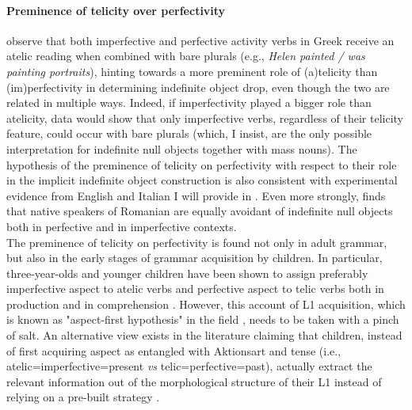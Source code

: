 \paragraph{Preminence of telicity over perfectivity}
\textcite[1598]{TsimpliPapadopoulou2006} observe that both imperfective and perfective activity verbs in Greek receive an atelic reading when combined with bare plurals (e.g., \textit{Helen painted / was painting portraits}), hinting towards a more preminent role of (a)telicity than (im)perfectivity in determining indefinite object drop, even though the two are related in multiple ways. Indeed, if imperfectivity played a bigger role than atelicity, data would show that only imperfective verbs, regardless of their telicity feature, could occur with bare plurals (which, I insist, are the only possible interpretation for indefinite null objects together with mass nouns). The hypothesis of the preminence of telicity on perfectivity with respect to their role in the implicit indefinite object construction is also consistent with experimental evidence from English and Italian I will provide in . Even more strongly, \textcite{Stoica2017} finds that native speakers of Romanian are equally avoidant of indefinite null objects both in perfective and in imperfective contexts.\\
The preminence of telicity on perfectivity is found not only in adult grammar, but also in the early stages of grammar acquisition by children. In particular, three-year-olds and younger children have been shown to assign preferably imperfective aspect to atelic verbs and perfective aspect to telic verbs both in production and in comprehension \parencite{Medina2007, olsenEtAl1998acquiring, wagner2001aspectual}. However, this account of L1 acquisition, which is known as "aspect-first hypothesis" in the field \parencite{antinucci1976children}, needs to be taken with a pinch of salt. An alternative view exists in the literature claiming that children, instead of first acquiring aspect as entangled with Aktionsart and tense (i.e., atelic=imperfective=present \textit{vs} telic=perfective=past), actually extract the relevant information out of the morphological structure of their L1 instead of relying on a pre-built strategy \parencite{bertinetto2021acquisition, BertinettoLenciEtAl2015}.

